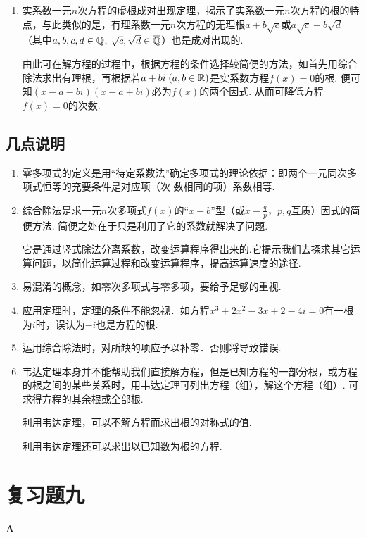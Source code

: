 \begin{enumerate}
\item 实系数一元$n$次方程的虚根成对出现定理，揭示了实系数一元$n$次方程的根的特点，与此类似的是，有理系数一元$n$次方程的无理根$a+b\sqrt{c}$或$a\sqrt{c}+b\sqrt{d}$（其中$a,b,c,d\in\mathbb{Q}$, $\sqrt{c},\sqrt{d}\in\overline{\mathbb{Q}}$）也是成对出现的.

由此可在解方程的过程中，根据方程的条件选择较简便的方法，如首先用综合除法求出有理根，再根据若$a+bi\; (a,b\in\mathbb{R})$是实系数方程$f(x)=0$的根. 便可知$(x-a-bi)(x-a+bi)$必为$f(x)$的两个因式. 从而可降低方程$f(x)=0$的次数.
\end{enumerate}

\subsection*{几点说明}
\begin{enumerate}
    \item 零多项式的定义是用“待定系数法”确定多项式的理论依据：即两个一元同次多项式恒等的充要条件是对应项（次
    数相同的项）系数相等.
    \item 综合除法是求一元$n$次多项式$f(x)$的“$x-b$”型（或$x-\frac{q}{p}$，$p,q$互质）因式的简便方法. 简便之处在于只是利用了它的系数就解决了问题.
    
    它是通过竖式除法分离系数，改变运算程序得出来的.它提示我们去探求其它运算问题，以简化运算过程和改变运算程序，提高运算速度的途径.
    \item 易混淆的概念，如零次多项式与零多项，要给予足够的重视.
    \item 应用定理时，定理的条件不能忽视．如方程$x^3+2x^2-3x+2-4i=0$有一根为$i$时，误认为$-i$也是方程的根.
    \item 运用综合除法时，对所缺的项应予以补零．否则将导致错误.
    \item 韦达定理本身并不能帮助我们直接解方程，但是已知方程的一部分根，或方程的根之间的某些关系时，用韦达定理可列出方程（组），解这个方程（组）. 可求得方程的其余根或全部根.
    
    利用韦达定理，可以不解方程而求出根的对称式的值. 
    
    利用韦达定理还可以求出以已知数为根的方程.
\end{enumerate}


\section*{复习题九}
\begin{center}
    \bfseries A
\end{center}

